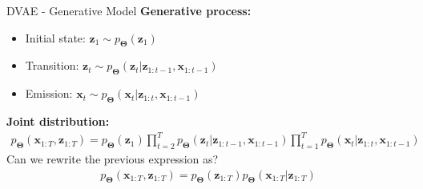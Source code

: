 \documentclass{beamer}
\newcommand{\bs}[1]{\boldsymbol{#1}}
\begin{document}
\begin{frame}{DVAE - Generative Model}
\textbf{Generative process:}
\begin{itemize}
  \item Initial state: $\bs{z}_1 \sim p_{\bs{\Theta}}(\bs{z}_1)$
  \item Transition: $\bs{z}_t \sim p_{\bs{\Theta}}(\bs{z}_t|\bs{z}_{1:t-1},\bs{x}_{1:t-1})$
  \item Emission: $\bs{x}_t \sim p_{\bs{\Theta}}(\bs{x}_t|\bs{z}_{1:t},\bs{x}_{1:t-1})$
\end{itemize}\vspace{3mm}

\textbf{Joint distribution:}
\begin{align}
p_{\bs{\Theta}}(\bs{x}_{1:T},\bs{z}_{1:T}) = p_{\bs{\Theta}}(\bs{z}_1) \prod_{t=2}^T p_{\bs{\Theta}}(\bs{z}_t|\bs{z}_{1:t-1},\bs{x}_{1:t-1}) \prod_{t=1}^T p_{\bs{\Theta}}(\bs{x}_t|\bs{z}_{1:t},\bs{x}_{1:t-1})
\end{align}
Can we rewrite the previous expression as?
\begin{align}
p_{\bs{\Theta}}(\bs{x}_{1:T},\bs{z}_{1:T}) = p_{\bs{\Theta}}(\bs{z}_{1:T}) p_{\bs{\Theta}}(\bs{x}_{1:T}|\bs{z}_{1:T})
\end{align}
\end{frame}
\end{document}
